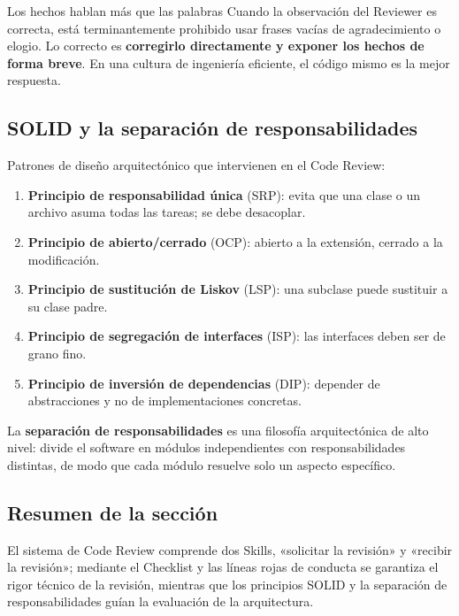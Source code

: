 \documentclass[a4paper]{article}
\begin{document}
\begin{importantbox}{Los hechos hablan más que las palabras}
Cuando la observación del Reviewer es correcta, está terminantemente prohibido usar frases vacías de agradecimiento o elogio. Lo correcto es \textbf{corregirlo directamente y exponer los hechos de forma breve}. En una cultura de ingeniería eficiente, el código mismo es la mejor respuesta.
\end{importantbox}

\subsection{SOLID y la separación de responsabilidades}

Patrones de diseño arquitectónico que intervienen en el Code Review:

\begin{enumerate}
    \item \textbf{Principio de responsabilidad única} (SRP): evita que una clase o un archivo asuma todas las tareas; se debe desacoplar.
    \item \textbf{Principio de abierto/cerrado} (OCP): abierto a la extensión, cerrado a la modificación.
    \item \textbf{Principio de sustitución de Liskov} (LSP): una subclase puede sustituir a su clase padre.
    \item \textbf{Principio de segregación de interfaces} (ISP): las interfaces deben ser de grano fino.
    \item \textbf{Principio de inversión de dependencias} (DIP): depender de abstracciones y no de implementaciones concretas.
\end{enumerate}

La \textbf{separación de responsabilidades} es una filosofía arquitectónica de alto nivel: divide el software en módulos independientes con responsabilidades distintas, de modo que cada módulo resuelve solo un aspecto específico.

\subsection{Resumen de la sección}

El sistema de Code Review comprende dos Skills, «solicitar la revisión» y «recibir la revisión»; mediante el Checklist y las líneas rojas de conducta se garantiza el rigor técnico de la revisión, mientras que los principios SOLID y la separación de responsabilidades guían la evaluación de la arquitectura.
\end{document}
